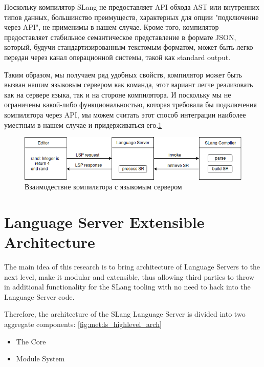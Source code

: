 Поскольку компилятор SLang\cite{Zouev2017} не предоставляет API обхода AST или внутренних типов данных, большинство преимуществ, 
характерных для опции "подключение через API", не применимы в нашем случае. 
Кроме того, компилятор предоставляет стабильное семантическое представление в формате JSON, который, 
будучи стандартизированным текстомым форматом, может быть легко передан через канал операционной системы, такой как standard output\cite{TheOpenGroup1997}.

Таким образом, мы получаем ряд удобных свойств, компилятор может быть вызван нашим языковым сервером как команда, 
этот вариант легче реализовать как на сервере языка, так и на стороне компилятора. 
И поскольку мы не ограничены какой-либо функциональностью, которая требовала бы подключения компилятора через API, 
мы можем считать этот способ интеграции наиболее уместным в нашем случае и придерживаться его.\ref{fig:met:compiler_integration}
\begin{figure}[H]
    \centering
    \includegraphics[width=1.0\textwidth]{figs/compiler_integration.png}
    \caption{Взаимодествие компилятора с языкомым сервером}
    \label{fig:met:compiler_integration}
\end{figure}

\section{Language Server Extensible Architecture}
\label{sec:met:arch}
The main idea of this research is to bring architecture of Language Servers to the next level,
make it modular and extensible, thus allowing third parties to throw in additional functionality for the SLang tooling
with no need to hack into the Language Server code.

Therefore, the architecture of the SLang Language Server is divided into two aggregate components: \ref{fig:met:ls_highlevel_arch}
\begin{itemize}
    \item The Core
    \item Module System
\end{itemize}

